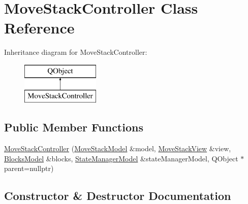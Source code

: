 \hypertarget{class_move_stack_controller}{}\section{Move\+Stack\+Controller Class Reference}
\label{class_move_stack_controller}
Inheritance diagram for Move\+Stack\+Controller\+:\begin{figure}[H]
\begin{center}
\leavevmode
\includegraphics[height=2.000000cm]{class_move_stack_controller}
\end{center}
\end{figure}
\subsection*{Public Member Functions}
\begin{DoxyCompactItemize}
\item 
\mbox{\hyperlink{class_move_stack_controller_a99115875c9902519a69eaec92df7dd7f}{Move\+Stack\+Controller}} (\mbox{\hyperlink{class_move_stack_model}{Move\+Stack\+Model}} \&model, \mbox{\hyperlink{class_move_stack_view}{Move\+Stack\+View}} \&view, \mbox{\hyperlink{class_blocks_model}{Blocks\+Model}} \&blocks, \mbox{\hyperlink{class_state_manager_model}{State\+Manager\+Model}} \&state\+Manager\+Model, Q\+Object $\ast$parent=nullptr)
\end{DoxyCompactItemize}


\subsection{Constructor \& Destructor Documentation}
\mbox{\label{class_move_stack_controller_a99115875c9902519a69eaec92df7dd7f}} 
